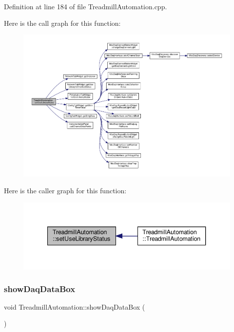 Definition at line 184 of file Treadmill\+Automation.\+cpp.

Here is the call graph for this function\+:
\nopagebreak
\begin{figure}[H]
\begin{center}
\leavevmode
\includegraphics[width=350pt]{class_treadmill_automation_affefe22059a06d2113ea25c5a4277f8d_cgraph}
\end{center}
\end{figure}
Here is the caller graph for this function\+:
\nopagebreak
\begin{figure}[H]
\begin{center}
\leavevmode
\includegraphics[width=340pt]{class_treadmill_automation_affefe22059a06d2113ea25c5a4277f8d_icgraph}
\end{center}
\end{figure}
\mbox{\label{class_treadmill_automation_a2c95c71e2ab52800e415565c9f59838c}} 
\subsubsection{\texorpdfstring{show\+Daq\+Data\+Box}{showDaqDataBox}}
{\footnotesize\ttfamily void Treadmill\+Automation\+::show\+Daq\+Data\+Box (\begin{DoxyParamCaption}{ }\end{DoxyParamCaption})\hspace{0.3cm}{\ttfamily [slot]}}



